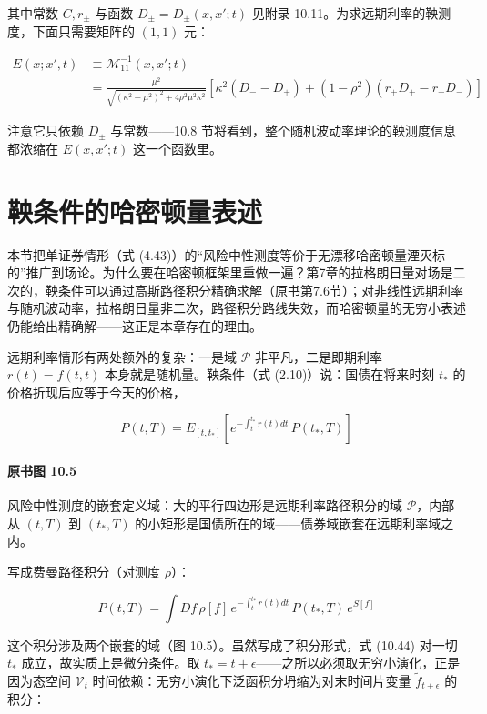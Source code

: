 其中常数 $C,r_\pm$ 与函数 $D_\pm=D_\pm(x,x';t)$ 见附录 10.11。为求远期利率的鞅测度，下面只需要矩阵的 $(1,1)$ 元：

\begin{equation*}
\begin{aligned}
E(x;x',t)&\equiv\mathcal{M}_{11}^{-1}(x,x';t)\\
&=\frac{\mu^2}{\sqrt{(\kappa^2-\mu^2)^2+4\rho^2\mu^2\kappa^2}}\left[\kappa^2(D_--D_+)+(1-\rho^2)(r_+D_+-r_-D_-)\right]
\end{aligned}
\tag{10.42}
\end{equation*}

注意它只依赖 $D_\pm$ 与常数——10.8 节将看到，整个随机波动率理论的鞅测度信息都浓缩在 $E(x,x';t)$ 这一个函数里。

\section{鞅条件的哈密顿量表述}

本节把单证券情形（式 (4.43)）的“风险中性测度等价于无漂移哈密顿量湮灭标的”推广到场论。为什么要在哈密顿框架里重做一遍？第7章的拉格朗日量对场是二次的，鞅条件可以通过高斯路径积分精确求解（原书第7.6节）；对非线性远期利率与随机波动率，拉格朗日量非二次，路径积分路线失效，而哈密顿量的无穷小表述仍能给出精确解——这正是本章存在的理由。

远期利率情形有两处额外的复杂：一是域 $\mathcal{P}$ 非平凡，二是即期利率 $r(t)=f(t,t)$ 本身就是随机量。鞅条件（式 (2.10)）说：国债在将来时刻 $t_*$ 的价格折现后应等于今天的价格，

\begin{equation*}
P(t,T)=E_{[t,t_*]}\left[e^{-\int_t^{t_*}r(t)dt}\,P(t_*,T)\right]
\tag{10.43}
\end{equation*}

\paragraph{原书图 10.5}\quad 风险中性测度的嵌套定义域：大的平行四边形是远期利率路径积分的域 $\mathcal{P}$，内部从 $(t,T)$ 到 $(t_*,T)$ 的小矩形是国债所在的域——债券域嵌套在远期利率域之内。

写成费曼路径积分（对测度 $\rho$）：

\begin{equation*}
P(t,T)=\int Df\,\rho[f]\,e^{-\int_t^{t_*}r(t)dt}\,P(t_*,T)\,e^{S[f]}
\tag{10.44}
\end{equation*}

这个积分涉及两个嵌套的域（图 10.5）。虽然写成了积分形式，式 (10.44) 对一切 $t_*$ 成立，故实质上是微分条件。取 $t_*=t+\epsilon$——之所以必须取无穷小演化，正是因为态空间 $\mathcal{V}_t$ 时间依赖：无穷小演化下泛函积分坍缩为对末时间片变量 $\tilde{f}_{t+\epsilon}$ 的积分：

